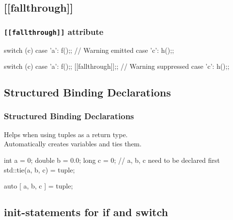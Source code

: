 \subsection[attr]{[[fallthrough]]}


\begin{frame}[fragile]
  \frametitle{\texttt{[[fallthrough]]} attribute}
  \begin{alertblock}{}
    \begin{cppcode}
      switch (c) {
        case 'a':
          f();; // Warning emitted
        case 'c':
          h();;
      }
    \end{cppcode}
  \end{alertblock}
  \begin{exampleblock}{}
    \begin{cppcode*}{}
      switch (c) {
        case 'a':
          f();;
          [[fallthrough]];; // Warning suppressed
        case 'c':
          h();;
      }
    \end{cppcode*}
  \end{exampleblock}
\end{frame}

\subsection[bind]{Structured Binding Declarations}

\begin{frame}[fragile]
  \frametitle{Structured Binding Declarations}
  Helps when using tuples as a return type.\\
  Automatically creates variables and ties them.
  \begin{alertblock}{}
    \begin{cppcode*}{}
      int a = 0;
      double b = 0.0;
      long c = 0;
      // a, b, c need to be declared first
      std::tie(a, b, c) = tuple;
    \end{cppcode*}
  \end{alertblock}
  \begin{exampleblock}{}
    \begin{cppcode*}{}
      auto [ a, b, c ] = tuple;
    \end{cppcode*}
  \end{exampleblock}
\end{frame}

\subsection[if]{init-statements for if and switch}

